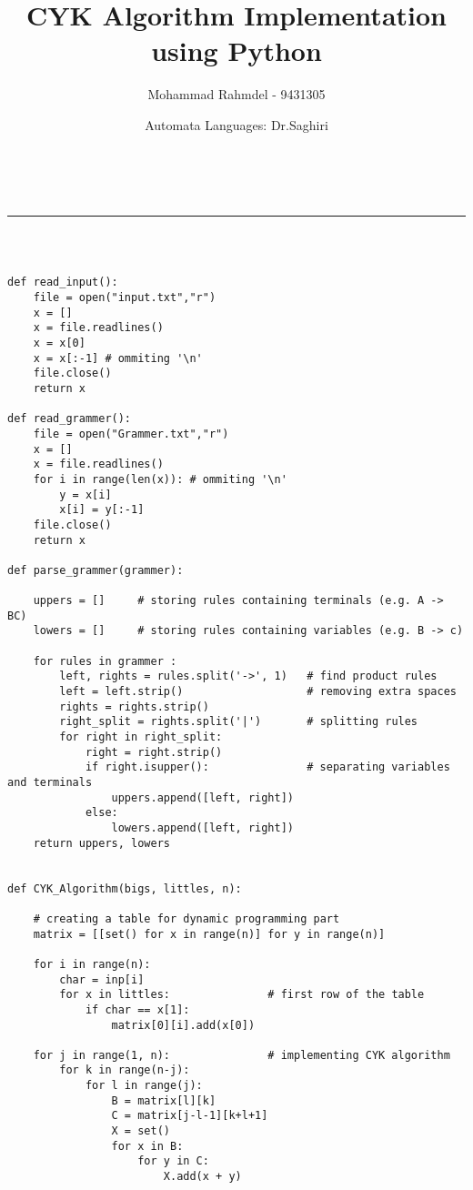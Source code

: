 \documentclass[a4paper,11pt]{article}
\makeatletter
\newcommand{\linia}{\rule{\linewidth}{0.5pt}}
\theoremstyle{mytheor}
\renewcommand{\maketitle}{
\begin{center}
\vspace{2ex}
{\huge \textsc{\@title}}
\vspace{1ex}
\\
\linia\\
\@author \hfill \@date
\vspace{4ex}
\end{center}
}
\makeatother
\begin{document}
\title{CYK Algorithm Implementation using Python}

\author{\large Mohammad Rahmdel - 9431305}

\date{\large Automata Languages: Dr.Saghiri}

\maketitle



\begin{lstlisting}[caption=https://github.com/Mohammad-Rahmdel/cyk\_algorithm]

def read_input():
	file = open("input.txt","r") 
	x = []
	x = file.readlines()
	x = x[0]
	x = x[:-1] # ommiting '\n'
	file.close()
	return x

def read_grammer():
	file = open("Grammer.txt","r") 
	x = []
	x = file.readlines()
	for i in range(len(x)): # ommiting '\n'
		y = x[i]
		x[i] = y[:-1]
	file.close()
	return x

def parse_grammer(grammer):

	uppers = []     # storing rules containing terminals (e.g. A -> BC)
	lowers = []     # storing rules containing variables (e.g. B -> c)
	
	for rules in grammer :
		left, rights = rules.split('->', 1)   # find product rules
		left = left.strip()                   # removing extra spaces
		rights = rights.strip()
		right_split = rights.split('|')       # splitting rules 
		for right in right_split:
			right = right.strip()
			if right.isupper():               # separating variables and terminals
				uppers.append([left, right])
			else:
				lowers.append([left, right])
	return uppers, lowers
	
	
def CYK_Algorithm(bigs, littles, n):

	# creating a table for dynamic programming part
	matrix = [[set() for x in range(n)] for y in range(n)]  
	
	for i in range(n):
		char = inp[i]
		for x in littles:               # first row of the table
			if char == x[1]:
				matrix[0][i].add(x[0])
				
	for j in range(1, n):               # implementing CYK algorithm
		for k in range(n-j):  
			for l in range(j):
				B = matrix[l][k]
				C = matrix[j-l-1][k+l+1]
				X = set()
				for x in B:
					for y in C:
						X.add(x + y)
				

\end{lstlisting}
\end{document}
